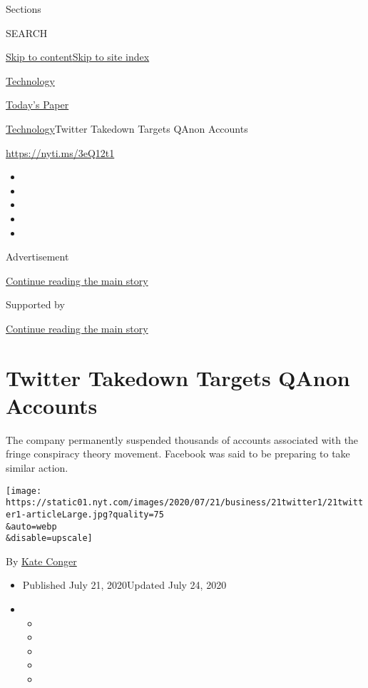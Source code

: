 Sections

SEARCH

\protect\hyperlink{site-content}{Skip to
content}\protect\hyperlink{site-index}{Skip to site index}

\href{https://www.nytimes.com/section/technology}{Technology}

\href{https://myaccount.nytimes.com/auth/login?response_type=cookie\&client_id=vi}{}

\href{https://www.nytimes.com/section/todayspaper}{Today's Paper}

\href{/section/technology}{Technology}\textbar{}Twitter Takedown Targets
QAnon Accounts

\url{https://nyti.ms/3eQ12t1}

\begin{itemize}
\item
\item
\item
\item
\item
\end{itemize}

Advertisement

\protect\hyperlink{after-top}{Continue reading the main story}

Supported by

\protect\hyperlink{after-sponsor}{Continue reading the main story}

\hypertarget{twitter-takedown-targets-qanon-accounts}{%
\section{Twitter Takedown Targets QAnon
Accounts}\label{twitter-takedown-targets-qanon-accounts}}

The company permanently suspended thousands of accounts associated with
the fringe conspiracy theory movement. Facebook was said to be preparing
to take similar action.

\texttt{[image: https://static01.nyt.com/images/2020/07/21/business/21twitter1/21twitter1-articleLarge.jpg?quality=75\\\&auto=webp\\\&disable=upscale]}

By \href{https://www.nytimes.com/by/kate-conger}{Kate Conger}

\begin{itemize}
\item
  Published July 21, 2020Updated July 24, 2020
\item
  \begin{itemize}
  \item
  \item
  \item
  \item
  \item
  \end{itemize}
\end{itemize}

